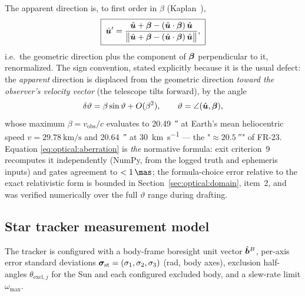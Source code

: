 The apparent direction is, to first order in $\beta$
(Kaplan~\cite{kaplan2005}),
\begin{equation}
  \boxed{\;
  \hat{\bm{u}}'
    = \frac{\hat{\bm{u}} + \bm{\beta}
        - (\hat{\bm{u}} \cdot \bm{\beta})\,\hat{\bm{u}}}
      {\bigl\lVert \hat{\bm{u}} + \bm{\beta}
        - (\hat{\bm{u}} \cdot \bm{\beta})\,\hat{\bm{u}} \bigr\rVert} ,
  \;}
  \label{eq:optical:aberration}
\end{equation}
i.e.\ the geometric direction plus the component of $\bm{\beta}$
perpendicular to it, renormalized. The sign convention, stated
explicitly because it is the usual defect: the \emph{apparent} direction
is displaced from the geometric direction \emph{toward the observer's
velocity vector} (the telescope tilts forward), by the angle
\begin{equation}
  \delta\vartheta = \beta \sin\vartheta + O(\beta^2),
  \qquad
  \vartheta = \angle(\hat{\bm{u}}, \bm{\beta}),
  \label{eq:optical:abmag}
\end{equation}
whose maximum $\beta = v_{\mathrm{obs}}/c$ evaluates to
\qty{20.49}{\arcsecond} at Earth's mean heliocentric speed
$v = \qty{29.78}{\kilo\metre\per\second}$ and
\qty{20.64}{\arcsecond} at \qty{30}{\kilo\metre\per\second} --- the
"$\approx \qty{20.5}{\arcsecond}$" of FR-23. Equation
\eqref{eq:optical:aberration} is \emph{the} normative formula: exit
criterion~9 recomputes it independently (NumPy, from the logged truth
and ephemeris inputs) and gates agreement to $< \qty{1}{\mas}$; the
formula-choice error relative to the exact relativistic form is bounded
in Section~\ref{sec:optical:domain}, item~2, and was verified
numerically over the full $\vartheta$ range during drafting.

\subsection{Star tracker measurement model}
\label{sec:optical:startracker}

The tracker is configured with a body-frame boresight unit vector
$\hat{\bm{b}}^{B}$, per-axis error standard deviations
$\bm{\sigma}_{\mathrm{st}} = (\sigma_1, \sigma_2, \sigma_3)$
(\unit{\radian}, body axes), exclusion half-angles
$\theta_{\mathrm{excl},j}$ for the Sun and each configured excluded
body, and a slew-rate limit $\omega_{\max}$.


